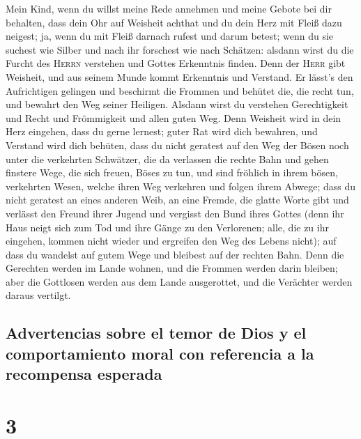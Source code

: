  Mein Kind, wenn du willst meine Rede annehmen und meine
Gebote bei dir behalten,  dass dein Ohr auf Weisheit
achthat und du dein Herz mit Fleiß dazu neigest;  ja, wenn
du mit Fleiß darnach rufest und darum betest;  wenn du sie
suchest wie Silber und nach ihr forschest wie nach Schätzen:
 alsdann wirst du die Furcht des \textsc{Herrn} verstehen
und Gottes Erkenntnis finden.  Denn der \textsc{Herr} gibt
Weisheit, und aus seinem Munde kommt Erkenntnis und Verstand.
 Er lässt's den Aufrichtigen gelingen und beschirmt die
Frommen  und behütet die, die recht tun, und bewahrt den
Weg seiner Heiligen.  Alsdann wirst du verstehen
Gerechtigkeit und Recht und Frömmigkeit und allen guten Weg.
 Denn Weisheit wird in dein Herz eingehen, dass du gerne
lernest;  guter Rat wird dich bewahren, und Verstand wird
dich behüten,  dass du nicht geratest auf den Weg der
Bösen noch unter die verkehrten Schwätzer,  die da
verlassen die rechte Bahn und gehen finstere Wege,  die
sich freuen, Böses zu tun, und sind fröhlich in ihrem bösen, verkehrten
Wesen,  welche ihren Weg verkehren und folgen ihrem
Abwege;  dass du nicht geratest an eines anderen Weib, an
eine Fremde, die glatte Worte gibt  und verlässt den
Freund ihrer Jugend und vergisst den Bund ihres Gottes 
(denn ihr Haus neigt sich zum Tod und ihre Gänge zu den Verlorenen;
 alle, die zu ihr eingehen, kommen nicht wieder und
ergreifen den Weg des Lebens nicht);  auf dass du
wandelst auf gutem Wege und bleibest auf der rechten Bahn.
 Denn die Gerechten werden im Lande wohnen, und die
Frommen werden darin bleiben;  aber die Gottlosen werden
aus dem Lande ausgerottet, und die Verächter werden daraus vertilgt.

\hypertarget{advertencias-sobre-el-temor-de-dios-y-el-comportamiento-moral-con-referencia-a-la-recompensa-esperada}{%
\subsection{Advertencias sobre el temor de Dios y el comportamiento
moral con referencia a la recompensa
esperada}\label{advertencias-sobre-el-temor-de-dios-y-el-comportamiento-moral-con-referencia-a-la-recompensa-esperada}}

\hypertarget{section-2}{%
\section{3}\label{section-2}}

